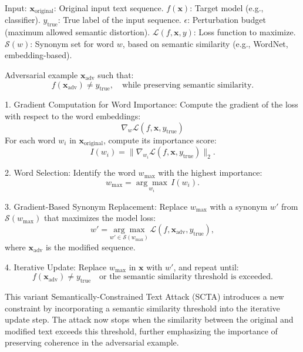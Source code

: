 Input: $\mathbf{x}_{\text{original}}$: Original input text sequence.  
$f(\mathbf{x})$: Target model (e.g., classifier).  
$y_{\text{true}}$: True label of the input sequence.  
$\epsilon$: Perturbation budget (maximum allowed semantic distortion).  
$\mathcal{L}(f, \mathbf{x}, y)$: Loss function to maximize.  
$\mathcal{S}(w)$: Synonym set for word $w$, based on semantic similarity (e.g., WordNet, embedding-based).

Adversarial example $\mathbf{x}_{\text{adv}}$ such that:
\[
f(\mathbf{x}_{\text{adv}}) \neq y_{\text{true}}, \quad \text{while preserving semantic similarity.}
\]

1. Gradient Computation for Word Importance:
   Compute the gradient of the loss with respect to the word embeddings:
   \[
   \nabla_w \mathcal{L}(f, \mathbf{x}, y_{\text{true}})
   \]
   For each word $w_i$ in $\mathbf{x}_{\text{original}}$, compute its importance score:
   \[
   I(w_i) = \|\nabla_{w_i} \mathcal{L}(f, \mathbf{x}, y_{\text{true}})\|_2.
   \]

2. Word Selection:
   Identify the word $w_{\text{max}}$ with the highest importance:
   \[
   w_{\text{max}} = \underset{w_i}{\arg \max} \, I(w_i).
   \]

3. Gradient-Based Synonym Replacement:
   Replace $w_{\text{max}}$ with a synonym $w'$ from $\mathcal{S}(w_{\text{max}})$ that maximizes the model loss:
   \[
   w' = \underset{w' \in \mathcal{S}(w_{\text{max}})}{\arg \max} \, \mathcal{L}(f, \mathbf{x}_{\text{adv}}, y_{\text{true}}),
   \]
   where $\mathbf{x}_{\text{adv}}$ is the modified sequence.

4. Iterative Update:
   Replace $w_{\text{max}}$ in $\mathbf{x}$ with $w'$, and repeat until:
   \[
   f(\mathbf{x}_{\text{adv}}) \neq y_{\text{true}} \quad \text{or the semantic similarity threshold is exceeded.}
   \]

This variant  Semantically-Constrained Text Attack (SCTA) introduces a new constraint by incorporating a semantic similarity threshold into the iterative update step. The attack now stops when the similarity between the original and modified text exceeds this threshold, further emphasizing the importance of preserving coherence in the adversarial example.